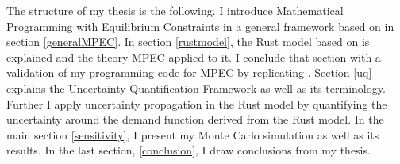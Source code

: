The structure of my thesis is the following. I introduce Mathematical Programming with Equilibrium Constraints in a general framework based on \cite{Su.Judd.2012} in section \ref{generalMPEC}. In section \ref{rustmodel}, the Rust model based on \cite{Rust.1987} is explained and the theory MPEC applied to it. I conclude that section with a validation of my programming code for MPEC by replicating \cite{Iskhakov.2016}. Section \ref{uq} explains the Uncertainty Quantification Framework as well as its terminology. Further I apply uncertainty propagation in the Rust model by quantifying the uncertainty around the demand function derived from the Rust model. In the main section \ref{sensitivity}, I present my Monte Carlo simulation as well as its results. In the last section, \ref{conclusion}, I draw conclusions from my thesis.

